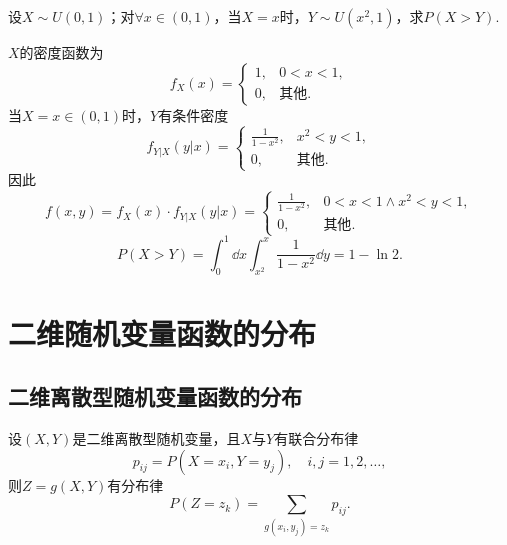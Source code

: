 \begin{example}
设\(X \sim U(0,1)\)；对\(\forall x\in(0,1)\)，当\(X=x\)时，\(Y \sim U(x^2,1)\)，求\(P(X > Y)\).
\begin{solution}
\(X\)的密度函数为\[
f_X(x) = \left\{ \begin{array}{cl}
1, & 0<x<1, \\
0, & \text{其他}.
\end{array} \right.
\]当\(X=x\in(0,1)\)时，\(Y\)有条件密度\[
f_{Y \vert X}(y \vert x)
= \left\{ \begin{array}{cl}
\frac{1}{1-x^2}, & x^2<y<1, \\
0, & \text{其他}.
\end{array} \right.
\]因此\[
f(x,y) = f_X(x) \cdot f_{Y \vert X}(y \vert x)
= \left\{ \begin{array}{cl}
\frac{1}{1-x^2}, & 0<x<1 \land x^2<y<1, \\
0, & \text{其他}.
\end{array} \right.
\]\[
P(X > Y)
= \int_0^1 \dd{x} \int_{x^2}^x \frac{1}{1-x^2} \dd{y}
= 1 - \ln2.
\]
\end{solution}
\end{example}

\section{二维随机变量函数的分布}
\subsection{二维离散型随机变量函数的分布}
设\((X,Y)\)是二维离散型随机变量，且\(X\)与\(Y\)有联合分布律\[
p_{ij} = P(X=x_i,Y=y_j), \quad i,j=1,2,\dotsc,
\]则\(Z = g(X,Y)\)有分布律\[
P(Z=z_k) = \sum_{g(x_i,y_j)=z_k}{p_{ij}}.
\]

